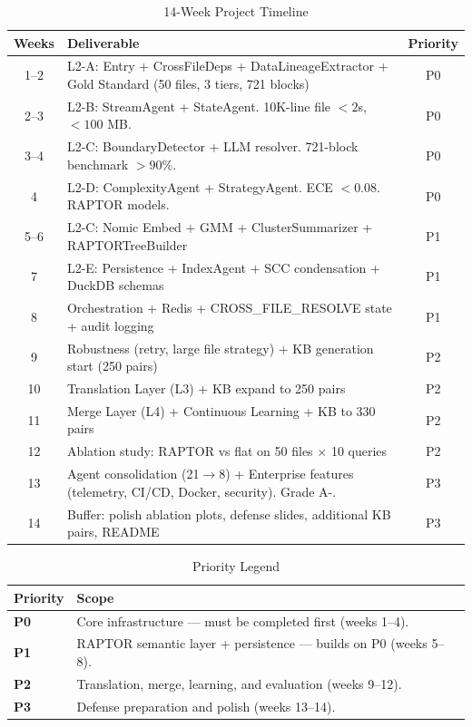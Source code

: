 \documentclass[11pt,a4paper]{article}
\begin{document}
\begin{table}[H]
\centering
\caption{14-Week Project Timeline}
\renewcommand{\arraystretch}{1.3}
\small
\begin{tabularx}{\textwidth}{@{} c X c @{}}
\toprule
\textbf{Weeks} & \textbf{Deliverable} & \textbf{Priority} \\
\midrule
\rowcolor{successgreen!8} 1–2 & L2-A: Entry + CrossFileDeps + DataLineageExtractor + Gold Standard (50 files, 3 tiers, 721 blocks) & P0 \\
\rowcolor{successgreen!8} 2–3 & L2-B: StreamAgent + StateAgent. 10K-line file $< 2$s, $< 100$ MB. & P0 \\
\rowcolor{successgreen!8} 3–4 & L2-C: BoundaryDetector + LLM resolver. 721-block benchmark $> 90\%$. & P0 \\
\rowcolor{successgreen!8} 4 & L2-D: ComplexityAgent + StrategyAgent. ECE $< 0.08$. RAPTOR models. & P0 \\
\rowcolor{warncolor!8} 5–6 & L2-C: Nomic Embed + GMM + ClusterSummarizer + RAPTORTreeBuilder & P1 \\
\rowcolor{warncolor!8} 7 & L2-E: Persistence + IndexAgent + SCC condensation + DuckDB schemas & P1 \\
\rowcolor{warncolor!8} 8 & Orchestration + Redis + CROSS\_FILE\_RESOLVE state + audit logging & P1 \\
9 & Robustness (retry, large file strategy) + KB generation start (250 pairs) & P2 \\
10 & Translation Layer (L3) + KB expand to 250 pairs & P2 \\
11 & Merge Layer (L4) + Continuous Learning + KB to 330 pairs & P2 \\
12 & Ablation study: RAPTOR vs flat on 50 files $\times$ 10 queries & P2 \\
\rowcolor{codebg} 13 & Agent consolidation (21$\to$8) + Enterprise features (telemetry, CI/CD, Docker, security). Grade A-. & P3 \\
\rowcolor{codebg} 14 & Buffer: polish ablation plots, defense slides, additional KB pairs, README & P3 \\
\bottomrule
\end{tabularx}
\end{table}

\begin{table}[H]
\centering
\caption{Priority Legend}
\renewcommand{\arraystretch}{1.2}
\begin{tabularx}{\textwidth}{@{} l X @{}}
\toprule
\textbf{Priority} & \textbf{Scope} \\
\midrule
\rowcolor{successgreen!8} \textbf{P0} & Core infrastructure — must be completed first (weeks 1–4). \\
\rowcolor{warncolor!8} \textbf{P1} & RAPTOR semantic layer + persistence — builds on P0 (weeks 5–8). \\
\textbf{P2} & Translation, merge, learning, and evaluation (weeks 9–12). \\
\rowcolor{codebg} \textbf{P3} & Defense preparation and polish (weeks 13–14). \\
\bottomrule
\end{tabularx}
\end{table}
\end{document}

